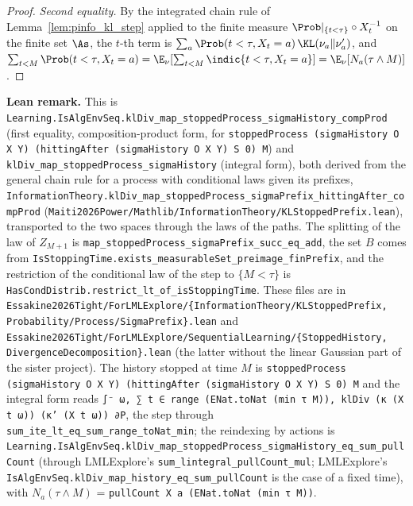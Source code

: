 \begin{proof}
\emph{Second equality.} By the integrated chain rule of Lemma~\ref{lem:pinfo_kl_step} applied
to the finite measure $\Prob|_{\{t<\tau\}}\circ X_t^{-1}$ on the finite set $\As$, the $t$-th
term is $\sum_a \Prob(t < \tau, X_t = a)\,\KL(\nu_a\|\nu'_a)$, and
$\sum_{t<M}\Prob(t<\tau, X_t = a) = \E_\nu[\sum_{t<M}\indic\{t<\tau, X_t = a\}] = \E_\nu[N_a(\tau\wedge M)]$.
\end{proof}

\textbf{Lean remark.} This is
\texttt{Learning.IsAlgEnvSeq.klDiv\_map\_stoppedProcess\_sigmaHistory\_compProd} (first
equality, composition-product form, for
\texttt{stoppedProcess (sigmaHistory O X Y) (hittingAfter (sigmaHistory O X Y) S 0) M})
and \texttt{klDiv\_map\_stoppedProcess\_sigmaHistory} (integral form), both derived from the
general chain rule for a process with conditional laws given its prefixes,
\texttt{InformationTheory.klDiv\_map\_stoppedProcess\_sigmaPrefix\_hittingAfter\_compProd}
(\texttt{Maiti2026Power/Mathlib/InformationTheory/KLStoppedPrefix.lean}), transported to the
two spaces through the laws of the paths. The splitting of the law of $Z_{M+1}$ is
\texttt{map\_stoppedProcess\_sigmaPrefix\_succ\_eq\_add}, the set $B$ comes from
\texttt{IsStoppingTime.exists\_measurableSet\_preimage\_finPrefix}, and the restriction of the
conditional law of the step to $\{M < \tau\}$ is \texttt{HasCondDistrib.restrict\_lt\_of\_isStoppingTime}.
These files are in
\texttt{Essakine2026Tight/ForLMLExplore/\{InformationTheory/KLStoppedPrefix,
Probability/Process/SigmaPrefix\}.lean} and
\texttt{Essakine2026Tight/ForLMLExplore/SequentialLearning/\{StoppedHistory,
DivergenceDecomposition\}.lean} (the latter without the linear Gaussian part of the sister
project). The history stopped at time $M$ is
\texttt{stoppedProcess (sigmaHistory O X Y) (hittingAfter (sigmaHistory O X Y) S 0) M}
and the integral form reads
\texttt{∫⁻ ω, ∑ t ∈ range (ENat.toNat (min τ M)), klDiv (κ (X t ω)) (κ' (X t ω)) ∂P}, the step
through \texttt{sum\_ite\_lt\_eq\_sum\_range\_toNat\_min}; the reindexing by actions is
\texttt{Learning.IsAlgEnvSeq.klDiv\_map\_stoppedProcess\_sigmaHistory\_eq\_sum\_pullCount} (through
LMLExplore's \texttt{sum\_lintegral\_pullCount\_mul}; LMLExplore's
\texttt{IsAlgEnvSeq.klDiv\_map\_history\_eq\_sum\_pullCount} is the case of a fixed time), with
$N_a(\tau\wedge M)$ = \texttt{pullCount X a (ENat.toNat (min τ M))}.

